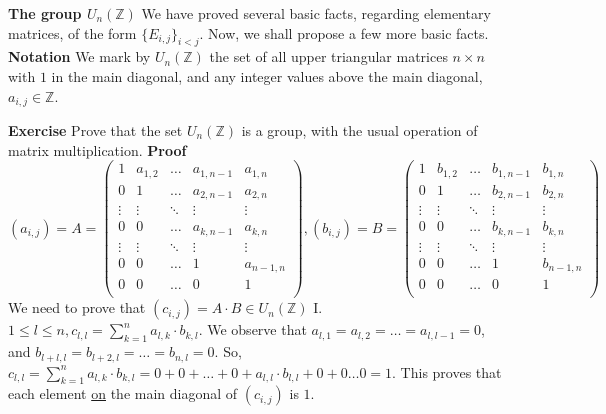 \documentclass[12pt]{article}
\begin{document}
\textbf{The group \( U_{n}(\mathbb{Z}) \)} \newline
We have proved several basic facts, regarding elementary matrices, of the form \( \{ E_{i,j} \}_{i<j} \). \newline
Now, we shall propose a few more basic facts. \newline
\textbf{Notation} \newline
We mark by \( U_{n}(\mathbb{Z}) \) the set of all upper triangular matrices \( n \times n \) with \( 1 \) in the main diagonal, 
and any integer values above the main diagonal, \( a_{i,j} \in \mathbb{Z} \). \newline

\textbf{Exercise} Prove that the set \( U_{n}(\mathbb{Z}) \) is a group, with the usual operation of matrix multiplication. \newline \newline
\textbf{Proof}
$$
(a_{i,j})=A=\begin{pmatrix} 
	1 & a_{1,2} & \dots & a_{1,n-1} & a_{1,n} \\
	0 & 1 & \dots & a_{2,n-1} & a_{2,n} \\
	\vdots & \vdots & \ddots & \vdots & \vdots \\
	0 & 0 & \dots & a_{k,n-1} & a_{k,n} \\
	\vdots & \vdots & \ddots & \vdots & \vdots \\
	0 & 0 & \dots & 1 & a_{n-1,n} \\
	0 & 0 & \dots & 0 & 1 \\
\end{pmatrix},
(b_{i,j})=B=\begin{pmatrix} 
	1 & b_{1,2} & \dots & b_{1,n-1} & b_{1,n} \\
	0 & 1 & \dots & b_{2,n-1} & b_{2,n} \\
	\vdots & \vdots & \ddots & \vdots & \vdots \\
	0 & 0 & \dots & b_{k,n-1} & b_{k,n} \\
	\vdots & \vdots & \ddots & \vdots & \vdots \\
	0 & 0 & \dots & 1 & b_{n-1,n} \\
	0 & 0 & \dots & 0 & 1 \\
\end{pmatrix}
$$
We need to prove that \( (c_{i,j})=A \cdot B \in U_{n}(\mathbb{Z}) \) \newline
I. \( 1 \leq l \leq n, c_{l,l}=\sum_{k=1}^{n} a_{l,k} \cdot b_{k,l} \). \newline
We observe that \( a_{l,1}=a_{l,2}= \dots =a_{l,l-1}=0 \), and \( b_{l+l,l}=b_{l+2,l}= \dots =b_{n,l}=0 \). \newline
So, \( c_{l,l}=\sum_{k=1}^{n} a_{l,k} \cdot b_{k,l}=0+0+ \dots +0+a_{l,l} \cdot b_{l,l}+0+0 \dots 0=1 \). \newline
This proves that each element \underline{on} the main diagonal of \( (c_{i,j}) \) is \( 1 \). \newline \newline
\end{document}
